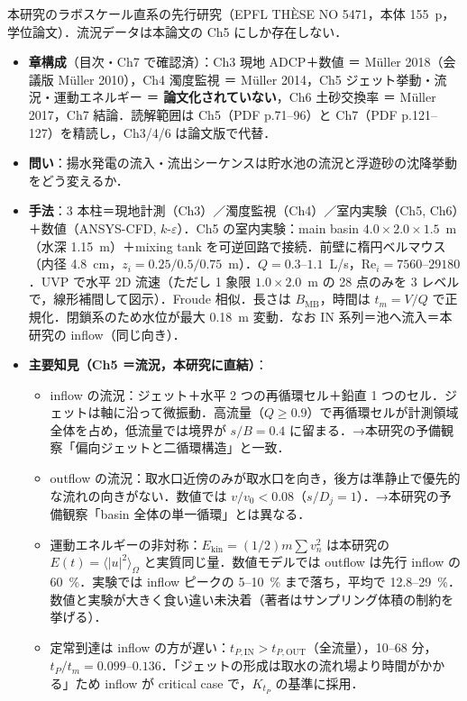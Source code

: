 \documentclass[11pt]{jsarticle}
\newcommand{\litref}[1]{{\large\bfseries\color{citecolor}#1}}
\begin{document}
\noindent\litref{M\"uller (2012)}\quad 本研究のラボスケール直系の先行研究（EPFL TH\`ESE NO 5471，本体 155~p，学位論文）．流況データは本論文の Ch5 にしか存在しない．
\begin{itemize}
  \item \textbf{章構成}（目次・Ch7 で確認済）：Ch3 現地 ADCP＋数値 ＝ M\"uller 2018（会議版 M\"uller 2010），Ch4 濁度監視 ＝ M\"uller 2014，Ch5 ジェット挙動・流況・運動エネルギー ＝ \textbf{論文化されていない}，Ch6 土砂交換率 ＝ M\"uller 2017，Ch7 結論．読解範囲は Ch5（PDF p.71--96）と Ch7（PDF p.121--127）を精読し，Ch3/4/6 は論文版で代替．
  \item \textbf{問い}：揚水発電の流入・流出シーケンスは貯水池の流況と浮遊砂の沈降挙動をどう変えるか．
  \item \textbf{手法}：3 本柱＝現地計測（Ch3）／濁度監視（Ch4）／室内実験（Ch5, Ch6）＋数値（ANSYS-CFD, $k$-$\varepsilon$）．Ch5 の室内実験：main basin $4.0 \times 2.0 \times 1.5$~m（水深 1.15~m）＋mixing tank を可逆回路で接続．前壁に楕円ベルマウス（内径 4.8~cm，$z_i = 0.25/0.5/0.75$~m）．$Q = 0.3$--$1.1$~L/s，$\mathrm{Re}_i = 7560$--$29180$．UVP で水平 2D 流速（ただし 1 象限 $1.0 \times 2.0$~m の 28 点のみを 3 レベルで，線形補間して図示）．Froude 相似．長さは $B_\mathrm{MB}$，時間は $t_m = V/Q$ で正規化．閉鎖系のため水位が最大 0.18~m 変動．なお IN 系列＝池へ流入＝本研究の inflow（同じ向き）．
  \item \textbf{主要知見（Ch5 ＝流況，本研究に直結）}：
  \begin{itemize}
    \item inflow の流況：ジェット＋水平 2 つの再循環セル＋鉛直 1 つのセル．ジェットは軸に沿って微振動．高流量（$Q \geq 0.9$）で再循環セルが計測領域全体を占め，低流量では境界が $s/B = 0.4$ に留まる．→本研究の予備観察「偏向ジェットと二循環構造」と一致．
    \item outflow の流況：取水口近傍のみが取水口を向き，後方は準静止で優先的な流れの向きがない．数値では $v/v_0 < 0.08$（$s/D_j = 1$）．→本研究の予備観察「basin 全体の単一循環」とは異なる．
    \item 運動エネルギーの非対称：$E_\mathrm{kin} = (1/2)m\sum v_n^2$ は本研究の $E(t) = \langle |u|^2 \rangle_\Omega$ と実質同じ量．数値モデルでは outflow は先行 inflow の 60~\%．実験では inflow ピークの 5--10~\% まで落ち，平均で 12.8--29~\%．数値と実験が大きく食い違い未決着（著者はサンプリング体積の制約を挙げる）．
    \item 定常到達は inflow の方が遅い：$t_{P,\mathrm{IN}} > t_{P,\mathrm{OUT}}$（全流量），10--68 分，$t_P/t_m = 0.099$--$0.136$．「ジェットの形成は取水の流れ場より時間がかかる」ため inflow が critical case で，$K_{t_P}$ の基準に採用．

\end{itemize}
\end{itemize}
\end{document}
